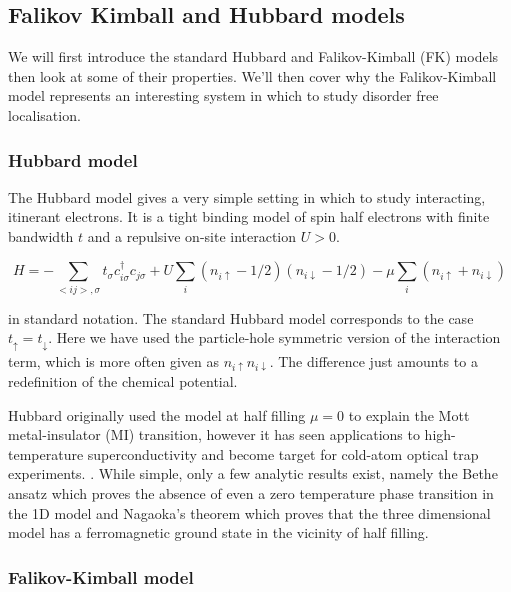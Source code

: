 \hypertarget{falikov-kimball-and-hubbard-models}{%
\subsection{Falikov Kimball and Hubbard models}\label{falikov-kimball-and-hubbard-models}}

We will first introduce the standard Hubbard and Falikov-Kimball (FK) models then look at some of their properties. We'll then cover why the Falikov-Kimball model represents an interesting system in which to study disorder free localisation.

\hypertarget{hubbard-model}{%
\subsubsection{Hubbard model}\label{hubbard-model}}

The Hubbard model gives a very simple setting in which to study interacting, itinerant electrons. It is a tight binding model of spin half electrons with finite bandwidth \(t\) and a repulsive on-site interaction \(U > 0\).

\[
    H = -\sum_{<ij>,\sigma} t_{\sigma} c^\dagger_{i\sigma}c_{j\sigma} + U \sum_{i} (n_{i \uparrow} - 1/2)( n_{i\downarrow} - 1/2) - \mu \sum_i \left( n_{i \uparrow} + n_{i \downarrow} \right)
\]

in standard notation. The standard Hubbard model corresponds to the case \(t_{\uparrow} = t_{\downarrow}\). Here we have used the particle-hole symmetric version of the interaction term, which is more often given as \(n_{i \uparrow} n_{i\downarrow}\). The difference just amounts to a redefinition of the chemical potential.

Hubbard originally used the model at half filling \(\mu = 0\) to explain the Mott metal-insulator (MI) transition, however it has seen applications to high-temperature superconductivity and become target for cold-atom optical trap experiments. \autocite{HubbardModelHalf2013,greiner_quantum_2002,jordens_mott_2008}. While simple, only a few analytic results exist, namely the Bethe ansatz \autocite{liebAbsenceMottTransition1968} which proves the absence of even a zero temperature phase transition in the 1D model and Nagaoka's theorem \autocite{nagaokaFerromagnetismNarrowAlmost1966} which proves that the three dimensional model has a ferromagnetic ground state in the vicinity of half filling.

\hypertarget{falikov-kimball-model}{%
\subsubsection{Falikov-Kimball model}\label{falikov-kimball-model}}

